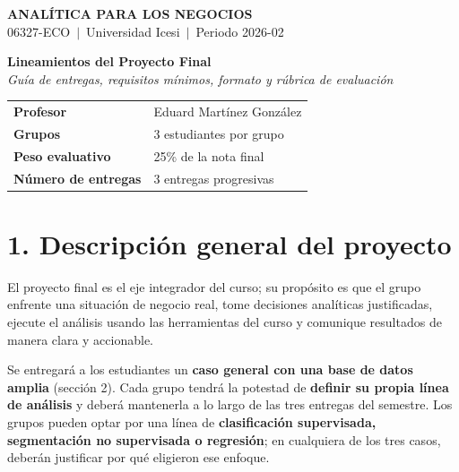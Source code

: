 \documentclass[11pt,letterpaper]{article}
\begin{document}
\thispagestyle{empty}
\vspace*{2.5cm}

\begin{center}
  {\large\textbf{ANALÍTICA PARA LOS NEGOCIOS}}\\[5pt]
  {\normalsize 06327-ECO\ $|$\ Universidad Icesi\ $|$\ Periodo 2026-02}
\end{center}

\vspace{3cm}
\begin{center}
  {\LARGE\bfseries Lineamientos del Proyecto Final}\\[10pt]
  {\normalsize\itshape Guía de entregas, requisitos mínimos, formato y rúbrica de evaluación}
\end{center}

\vspace{3.5cm}
\begin{center}
\begin{tabular}{@{}ll@{}}
  \textbf{Profesor}           & Eduard Martínez González \\[3pt]
  \textbf{Grupos}             & 3 estudiantes por grupo \\[3pt]
  \textbf{Peso evaluativo}    & 25\% de la nota final \\[3pt]
  \textbf{Número de entregas} & 3 entregas progresivas \\
\end{tabular}
\end{center}
\clearpage
\tableofcontents
\clearpage

\section{1. Descripción general del proyecto}

El proyecto final es el eje integrador del curso; su propósito es que el grupo enfrente una situación de negocio real, tome decisiones analíticas justificadas, ejecute el análisis usando las herramientas del curso y comunique resultados de manera clara y accionable.

Se entregará a los estudiantes un \textbf{caso general con una base de datos amplia} (sección 2). Cada grupo tendrá la potestad de \textbf{definir su propia línea de análisis} y deberá mantenerla a lo largo de las tres entregas del semestre. Los grupos pueden optar por una línea de \textbf{clasificación supervisada, segmentación no supervisada o regresión}; en cualquiera de los tres casos, deberán justificar por qué eligieron ese enfoque.
\end{document}
